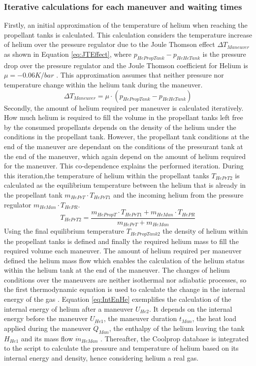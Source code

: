 \subsubsection{Iterative calculations for each maneuver and waiting times}
Firstly, an initial approximation of the temperature of helium when reaching the propellant tanks is calculated. This calculation considers the temperature increase of helium over the pressure regulator due to the Joule Thomson effect \(\Delta T_{Maneuver}\) \cite{Mage1965} as shown in Equation \ref{eq:JTEffect}, where \(p_{HePropTank}-p_{HeHeTank}\) is the pressure drop over the pressure regulator and the Joule Thomson coefficient for Helium is \(\mu=-0.06  K/bar\) \cite{Mage1965}. This approximation assumes that neither pressure nor temperature change within the helium tank during the maneuver. 
\begin{equation}
 \Delta T_{Maneuver} = \mu \cdot (p_{HePropTank}-p_{HeHeTank})
\label{eq:JTEffect}
\end{equation}
Secondly, the amount of helium required per maneuver is calculated iteratively. How much helium is required to fill the volume in the propellant tanks left free by the consumed propellants depends on the density of the helium under the conditions in the propellant tank. However, the propellant tank conditions at the end of the maneuver are dependant on the conditions of the pressurant tank at the end of the maneuver, which again depend on the amount of helium required for the maneuver. This co-dependence explains the performed iteration. During this iteration,the temperature of helium within the propellant tanks \(T_{HePrT2}\) is calculated as the equilibrium temperature between the helium that is already in the propellant tank \(m_{HePrT}\cdot T_{HePrT1}\) and the incoming helium from the pressure regulator \(m_{HeMan}\cdot T_{HePR}\). 
\begin{equation}
    T_{HePrT2} =
    \frac{m_{HePropT}\cdot T_{HePrT1}+m_{HeMan}\cdot T_{HePR}}{m_{HePrT}+m_{HeMan}}
\label{eq:TempHeProp}
\end{equation}
Using the final equilibrium temperature \(T_{HePropTank2}\) the density of helium within the propellant tanks is defined and finally the required helium mass to fill the required volume each maneuver.
The amount of helium required per maneuver defined the helium mass flow which enables the calculation of the helium status within the helium tank at the end of the maneuver. The changes of helium conditions over the maneuvers are neither isothermal nor adiabatic processes, so the first thermodynamic equation is used to calculate the change in the internal energy of the gas \cite{BottleBl30:online}. Equation \ref{eq:IntEnHe} exemplifies the calculation of the internal energy of helium after a maneuver \(U_{He2}\). It depends on the internal energy before the maneuver \(U_{He1}\), the maneuver duration \(t_{Man}\), the heat load applied during the maneuver \(\dot{Q}_{Man}\), the enthalpy of the helium leaving the tank \(H_{He1}\) and its mass flow \(\dot{m}_{HeMan}\) \cite{BottleBl30:online}. Thereafter, the Coolprop database \cite{CoolProp} is integrated to the script to calculate the pressure and temperature of helium based on its internal energy and density, hence considering helium a real gas.
